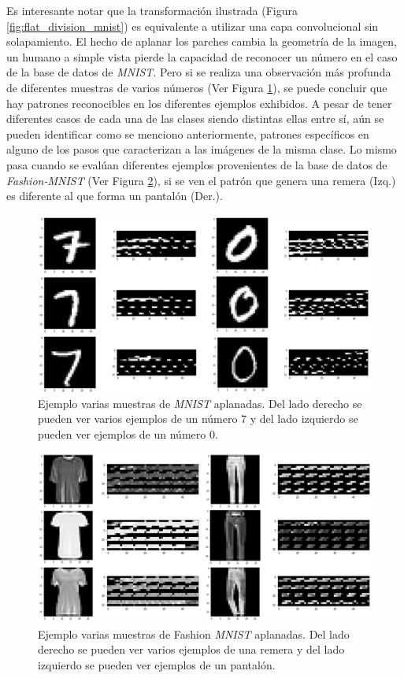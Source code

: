 \documentclass[spanish]{article}
\theoremstyle{definition}
\theoremstyle{remark}
\numberwithin{equation}{section}
\numberwithin{equation}{section} %
\begin{document}
Es interesante notar que la transformación ilustrada (Figura \ref{fig:flat_division_mnist}) es equivalente a utilizar una capa convolucional sin solapamiento. El hecho de aplanar los parches cambia la geometría de la imagen, un humano a simple vista pierde la capacidad de reconocer un número en el caso de la base de datos de \textit{MNIST}. Pero si se realiza una observación más profunda de diferentes muestras de varios números (Ver Figura \ref{fig:several_flat_division_mnist}), se puede concluir que hay patrones reconocibles en los diferentes ejemplos exhibidos. A pesar de tener diferentes casos de cada una de las clases siendo distintas ellas entre sí, aún se pueden identificar como se menciono anteriormente, patrones específicos en alguno de los pasos que caracterizan a las imágenes de la misma clase. Lo mismo pasa cuando se evalúan diferentes ejemplos provenientes de la base de datos de \textit{Fashion-MNIST} (Ver Figura \ref{fig:several_flat_division_mnist_fashion_mnist}), si se ven el patrón que genera una remera (Izq.) es diferente al que forma un  pantalón (Der.).\par
\begin{figure}[H]
\centering
\includegraphics[width=12cm]{img/ejemplo_several_flat_division_tensor.png}
\caption[Ejemplo varias muestras de \textit{MNIST} aplanadas]{\footnotesize{ Ejemplo varias muestras de \textit{MNIST} aplanadas. Del lado derecho se pueden ver varios ejemplos de un número 7 y del lado izquierdo se pueden ver ejemplos de un número 0. }}
\label{fig:several_flat_division_mnist}
\end{figure}
\begin{figure}[H]
\centering
\includegraphics[width=12cm]{img/ejemplo_several_flat_division_tensor_fashion_mnist.png}
\caption[Ejemplo varias muestras de Fashion \textit{MNIST} aplanadas]{\footnotesize{ Ejemplo varias muestras de Fashion \textit{MNIST} aplanadas. Del lado derecho se pueden ver varios ejemplos de una remera  y del lado izquierdo se pueden ver ejemplos de un pantalón. }}
\label{fig:several_flat_division_mnist_fashion_mnist}
\end{figure}
\end{document}

